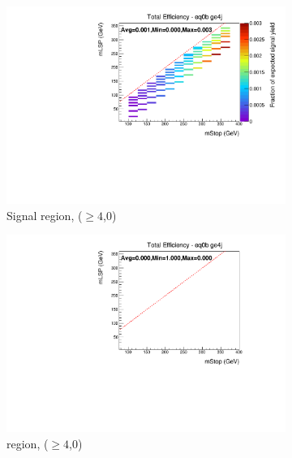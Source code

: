 \begin{figure}[ht!]
  \begin{subfigure}[b]{0.47\textwidth}
    \includegraphics[width=\textwidth]{Figs/sms/t2cc/v24/T2cc_v24_had_eff_maps_eq0b_ge4j_SITV.pdf}
    \caption{Signal region, ($\geq 4$,0)}
    \label{fig:t2cc_sig_eff_ge4j_0b}
  \end{subfigure}
  \begin{subfigure}[b]{0.47\textwidth}
    \includegraphics[width=\textwidth]{Figs/sms/t2cc/v24/T2cc_v24_muon_eff_maps_eq0b_ge4j_SITV.pdf}
    \caption{\mj region, ($\geq 4$,0)}
    \label{fig:t2cc_mu_eff_ge4j_0b}
  \end{subfigure} \\
  \begin{subfigure}[b]{0.47\textwidth}

\end{subfigure}
\end{figure}
